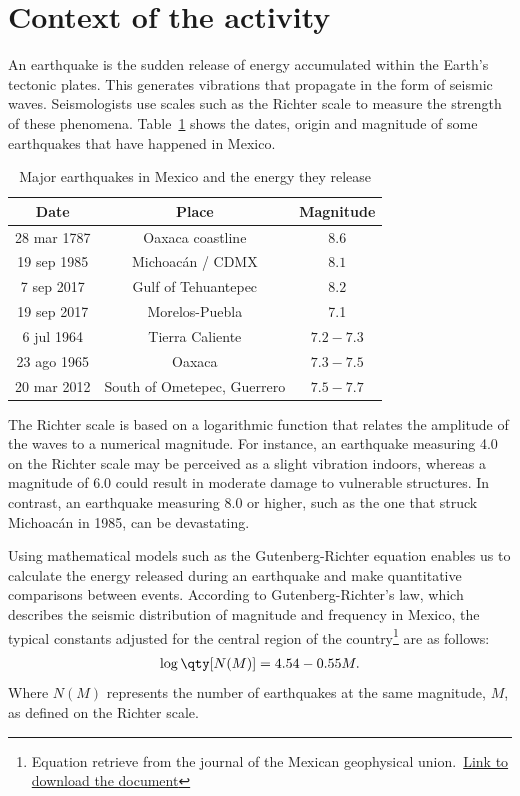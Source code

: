 \documentclass[../main.tex]{subfiles}
\begin{document}
\section{Context of the activity}

An earthquake is the sudden release of energy accumulated within the Earth's tectonic plates. 
This generates vibrations that propagate in the form of seismic waves. 
Seismologists use scales such as the Richter scale to measure the strength of these phenomena.
Table~\ref{tab:sismos-mexico} shows the dates, origin and magnitude of some earthquakes that have happened in Mexico.

\begin{table}[ht!]
\centering
\begin{tabular}{c c c}
\toprule
\textbf{Date} & \textbf{Place} & \textbf{Magnitude} \\
\midrule
28 mar 1787 & Oaxaca coastline & $8.6$ \\
19 sep 1985 & Michoacán / CDMX & $8.1$ \\
7 sep 2017 & Gulf of Tehuantepec & $8.2$ \\
19 sep 2017 & Morelos-Puebla & 7.1 \\
6 jul 1964 & Tierra Caliente & $7.2-7.3$ \\
23 ago 1965 & Oaxaca & $7.3-7.5$ \\
20 mar 2012 & South of Ometepec, Guerrero & $7.5-7.7$ \\
\bottomrule
\end{tabular}
    \caption{Major earthquakes in Mexico and the energy they release}\label{tab:sismos-mexico}
\end{table}

The Richter scale is based on a logarithmic function that relates the amplitude of the waves to a numerical magnitude. 
For instance, an earthquake measuring 4.0 on the Richter scale may be perceived as a slight vibration indoors, whereas a magnitude of 6.0 could result in moderate damage to vulnerable structures. 
In contrast, an earthquake measuring 8.0 or higher, such as the one that struck Michoacán in 1985, can be devastating.

Using mathematical models such as the Gutenberg-Richter equation enables us to calculate the energy released during an earthquake and make quantitative comparisons between events. 
According to Gutenberg-Richter's law, which describes the seismic distribution of magnitude and frequency in Mexico, the typical constants adjusted for the central region of the country\footnote{Equation retrieve from the journal of the Mexican geophysical union.~\href{https://revistagi.geofisica.unam.mx/index.php/RGI/article/download/1638/1789/1961}{Link to download the document}} are as follows:
\begin{gather}
    \log\qty[N(M)] = 4.54 - 0.55 M.\label{eqn:numer-magnitude}
\end{gather}
Where $N(M)$ represents the number of earthquakes at the same magnitude, $M$, as defined on the Richter scale.
\end{document}
